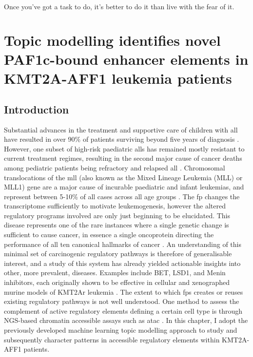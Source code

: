 \begin{savequote}[8cm]
    Once you've got a task to do, it's better to do it than live with the fear of it.
\end{savequote}

\chapter{Topic modelling identifies novel PAF1c-bound enhancer elements in KMT2A-AFF1 leukemia patients}

\minitoc


\section{Introduction} \label{ch5:intro}

Substantial advances in the treatment and supportive care of children with \gls{all} have resulted in over 90\% of patients surviving beyond five years of diagnosis \cite{Inaba2021}. However, one subset of high-risk paediatric \glspl{all} has remained mostly resistant to current treatment regimes, resulting in the second major cause of cancer deaths among pediatric patients being refractory and relapsed \gls{all} \cite{Inaba2021}. Chromosomal translocations of the \gls{mll} (also known as the Mixed Lineage Leukemia (MLL) or MLL1) gene are a major cause of incurable paediatric and infant leukemias, and represent between 5-10\% of \gls{all} cases across all age groups \cite{Rice2020b}. The \gls{fp} changes the transcriptome sufficiently to motivate leukemogenesis, however the altered regulatory programs involved are only just beginning to be elucidated. This disease represents one of the rare instances where a single genetic change is sufficient to cause cancer, in essence a single oncoprotein directing the performance of all ten canonical hallmarks of cancer \cite{Rao2015,Hanahan2011}. An understanding of this minimal set of carcinogenic regulatory pathways is therefore of generalisable interest, and a study of this system has already yielded actionable insights into other, more prevalent, diseases. Examples include BET, LSD1, and Menin inhibitors, each originally shown to be effective in cellular and xenographed murine models of KMT2Ar leukemia \cite{Issa2021,Fang2019,Shorstova2021,Abedin2016}. The extent to which \glspl{fp} creates or reuses existing regulatory pathways is not well understood. One method to assess the complement of active regulatory elements defining a certain cell type is through NGS-based chromatin accessible assays such as \gls{atac} \cite{Minnoye2021, Liu2020}. In this chapter, I adopt the previously developed machine learning topic modelling approach to study and subsequently character patterns in accessible regulatory elements within KMT2A-AFF1 patients.  

